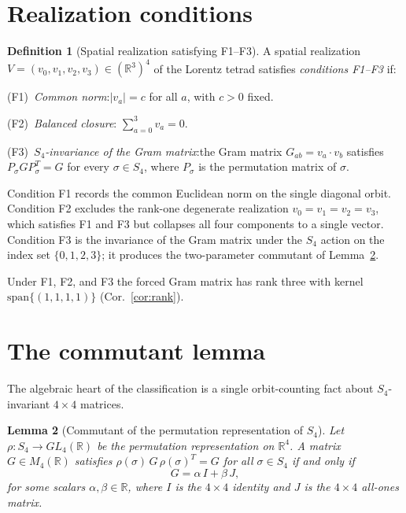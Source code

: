 \documentclass[twocolumn]{iopjournal}
\newtheorem{lemma}{Lemma}
\theoremstyle{definition}
\newtheorem{definition}[lemma]{Definition}
\begin{document}

\section*{Realization conditions}

\begin{definition}[Spatial realization satisfying F1--F3]
\label{def:equiv}
A spatial realization $V = (v_0, v_1, v_2, v_3) \in (\mathbb{R}^3)^4$
of the Lorentz tetrad satisfies \emph{conditions F1--F3}
if:

\textup{(F1)}~\emph{Common norm}:\quad $|v_a| = c$ for all $a$,
with $c > 0$ fixed.

\textup{(F2)}~\emph{Balanced closure}:\quad
$\sum_{a=0}^{3} v_a = 0$.

\textup{(F3)}~\emph{$S_4$-invariance of the Gram matrix}:\quad the
Gram matrix $G_{ab} = v_a \cdot v_b$ satisfies
$P_\sigma G P_\sigma^T = G$ for every $\sigma \in S_4$, where
$P_\sigma$ is the permutation matrix of $\sigma$.
\end{definition}

\noindent
Condition F1 records the common Euclidean norm on the single
diagonal orbit.
Condition F2 excludes the rank-one degenerate realization
$v_0 = v_1 = v_2 = v_3$, which satisfies F1 and F3 but collapses
all four components to a single vector.  Condition F3 is the invariance
of the Gram matrix under the $S_4$ action on the index set
$\{0,1,2,3\}$; it produces the two-parameter commutant of
Lemma~\ref{lem:commutant}.

\noindent
Under F1, F2, and F3 the forced Gram matrix has rank three with
kernel $\mathrm{span}\{(1,1,1,1)\}$ (Cor.~\ref{cor:rank}).


\section*{The commutant lemma}

The algebraic heart of the classification is a single
orbit-counting fact about $S_4$-invariant $4 \times 4$ matrices.

\begin{lemma}[Commutant of the permutation representation of $S_4$]
\label{lem:commutant}
Let $\rho: S_4 \to GL_4(\mathbb{R})$ be the permutation
representation on $\mathbb{R}^4$.  A matrix $G \in M_4(\mathbb{R})$
satisfies $\rho(\sigma)\,G\,\rho(\sigma)^T = G$ for all
$\sigma \in S_4$ if and only if
\begin{equation}
  G = \alpha\,I + \beta\,J,
  \label{eq:commutant}
\end{equation}
for some scalars $\alpha, \beta \in \mathbb{R}$, where $I$ is the
$4 \times 4$ identity and $J$ is the $4 \times 4$ all-ones matrix.
\end{lemma}
\end{document}
